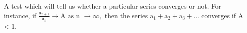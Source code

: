 A test which will tell us whether a particular series converges or not.
For instance, if $ \frac{\mathrm{a}_{\mathrm{n+1}}}{\mathrm{a}_{\mathrm{n}}} 
\to \text{A as n } \to \infty , $ then the series $ \mathrm{a}_1 + \mathrm{a}_2 
+ \mathrm{a}_3 + ... $ converges if A < 1.